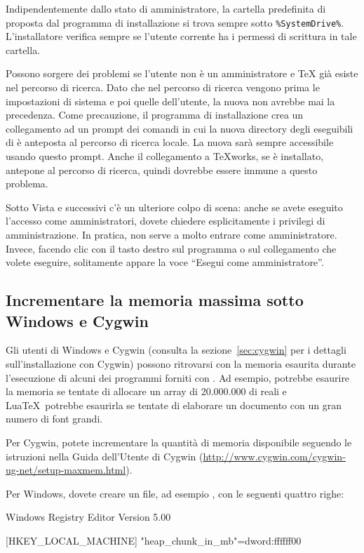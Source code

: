 \documentclass{article}
\begin{document}
Indipendentemente dallo stato di amministratore, la cartella predefinita
di \TL{} proposta dal programma di installazione si trova sempre sotto
\verb|%SystemDrive%|. L'installatore verifica sempre se l'utente corrente
ha i permessi di scrittura in tale cartella.

Possono sorgere dei problemi se l'utente non è un amministratore e \TeX{}
già esiste nel percorso di ricerca. Dato che nel percorso di ricerca
vengono prima le impostazioni di sistema e poi quelle dell'utente, la
nuova \TL{} non avrebbe mai la precedenza. Come precauzione, il programma
di installazione crea un collegamento ad un prompt dei comandi in cui la
nuova directory degli eseguibili di \TL{} è anteposta al percorso di
ricerca locale. La nuova \TL{} sarà sempre accessibile usando questo
prompt. Anche il collegamento a \TeX{}works, se è installato, antepone
\TL{} al percorso di ricerca, quindi dovrebbe essere immune a questo
problema.

Sotto Vista e successivi c'è un ulteriore colpo di scena: anche se avete
eseguito l'accesso come amministratori, dovete chiedere esplicitamente i
privilegi di amministrazione. In pratica, non serve a molto entrare come
amministratore. Invece, facendo clic con il tasto destro sul programma o
sul collegamento che volete eseguire, solitamente appare la voce ``Esegui
come amministratore''.

\subsection{Incrementare la memoria massima sotto Windows e Cygwin}
\label{sec:cygwin-maxmem}

Gli utenti di Windows e Cygwin (consulta la sezione~\ref{sec:cygwin} per i
dettagli sull'installazione con Cygwin) possono ritrovarsi con la memoria
esaurita durante l'esecuzione di alcuni dei programmi forniti con \TL. Ad
esempio,  potrebbe esaurire la memoria se tentate di allocare un
array di 20.000.000 di reali e Lua\TeX\ potrebbe esaurirla se tentate di
elaborare un documento con un gran numero di font grandi.

Per Cygwin, potete incrementare la quantità di memoria disponibile seguendo
le istruzioni nella Guida dell'Utente di Cygwin
(\url{http://www.cygwin.com/cygwin-ug-net/setup-maxmem.html}).

Per Windows, dovete creare un file, ad esempio , con le
seguenti quattro righe:

\begin{sverbatim}
Windows Registry Editor Version 5.00

[HKEY_LOCAL_MACHINE\Software\Cygwin]
"heap_chunk_in_mb"=dword:ffffff00
\end{sverbatim}
\end{document}
